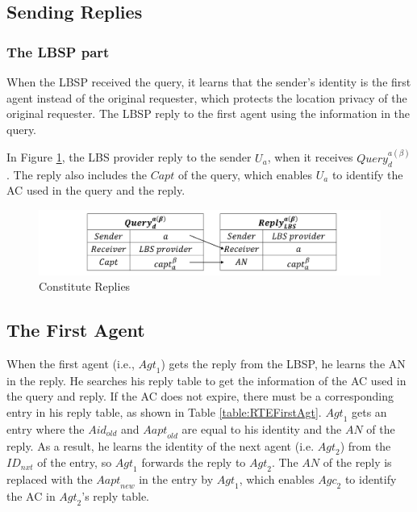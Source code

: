 \subsection{ Sending Replies}


\subsubsection{ The LBSP part}

\noindent When the LBSP received the query, it learns that the sender's identity is the first agent instead of the original requester, which protects the location privacy of the original requester. The LBSP reply to the first agent using the information in the query.

In Figure \ref{fig:ConstituteReplies}, the LBS provider reply to the sender $U_a$, when it receives ${Query}^{a\left(\beta\right)}_d$. The reply also includes the $Capt$ of the query, which enables $U_a$ to identify the AC used in the query and the reply.

\begin{figure} [H]
  \centering 
  \includegraphics[width=6.0in]{figures/FIG_4_6_Constitute_Replies.png}
  \caption{Constitute Replies} 
  \label{fig:ConstituteReplies} %
\end{figure}

\subsection{ The First Agent}

\noindent When the first agent (i.e., ${Agt}_1$) gets the reply from the LBSP, he learns the $\mathrm{AN}$ in the reply. He searches his reply table to get the information of the AC used in the query and reply. If the AC does not expire, there must be a corresponding entry in his reply table, as shown in Table \ref{table:RTEFirstAgt}. ${Agt}_1$ gets an entry where the $Aid_{old}$ and ${Aapt}_{old}$ are equal to his identity and the $AN$ of the reply. As a result, he learns the identity of the next agent (i.e. ${Agt}_2$) from the ${ID}_{nxt}$ of the entry, so ${Agt}_1$ forwards the reply to ${Agt}_2$. The $AN$ of the reply is replaced with the ${Aapt}_{new}$ in the entry by ${Agt}_1$, which enables ${Agc}_2$ to identify the AC in ${Agt}_2$'s reply table.

